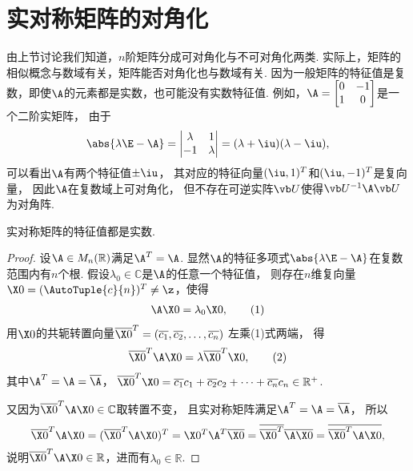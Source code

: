\section{实对称矩阵的对角化}
由上节讨论我们知道，\(n\)阶矩阵分成可对角化与不可对角化两类.
实际上，矩阵的相似概念与数域有关，矩阵能否对角化也与数域有关.
因为一般矩阵的特征值是复数，即使\(\A\)的元素都是实数，也可能没有实数特征值.
例如，\(\A = \begin{bmatrix} 0 & -1 \\ 1 & 0 \end{bmatrix}\)是一个二阶实矩阵，
由于\[
	\abs{\lambda\E-\A}
	= \begin{vmatrix}
		\lambda & 1 \\
		-1 & \lambda
	\end{vmatrix}
	= (\lambda+\iu)(\lambda-\iu),
\]
可以看出\(\A\)有两个特征值\(\pm\iu\)，
其对应的特征向量\((\iu,1)^T\)和\((\iu,-1)^T\)是复向量，
因此\(\A\)在复数域上可对角化，
但不存在可逆实阵\(\P\)使得\(\P^{-1}\A\P\)为对角阵.

\begin{theorem}\label{theorem:特征值与特征向量.实对称矩阵1}
实对称矩阵的特征值都是实数.
\begin{proof}
设\(\A \in M_n(\mathbb{R})\)满足\(\A^T=\A\).
显然\(\A\)的特征多项式\(\abs{\lambda\E-\A}\)在复数范围内有\(n\)个根.
假设\(\lambda_0\in\mathbb{C}\)是\(\A\)的任意一个特征值，
则存在\(n\)维复向量\(\X0=(\AutoTuple{c}{n})^T \neq \z\)，使得
\begin{gather}
	\A\X0 = \lambda_0 \X0, \tag1
\end{gather}
用\(\X0\)的共轭转置向量\(\overline{\X0}^T
=(\overline{c_1},\overline{c_2},\dotsc,\overline{c_n})\)
左乘(1)式两端，
得\begin{gather}
	\overline{\X0}^T \A \X0 = \lambda \overline{\X0}^T \X0, \tag2
\end{gather}
其中\(\A^T=\A=\overline{\A}\)，
\(\overline{\X0}^T \X0
= \overline{c_1}c_1 + \overline{c_2}c_2 + \dotsb + \overline{c_n}{c_n} \in \mathbb{R}^+\).

又因为\(\overline{\X0}^T \A \X0 \in \mathbb{C}\)取转置不变，
且实对称矩阵满足\(\A^T = \A = \overline{\A}\)，
所以\[
	\overline{\X0}^T \A \X0
	= (\overline{\X0}^T \A \X0)^T
	= \X0^T \A^T \overline{\X0}
	= \overline{\overline{\X0}^T} \overline{\A} \overline{\X0}
	= \overline{\overline{\X0}^T \A \X0},
\]
说明\(\overline{\X0}^T \A \X0 \in \mathbb{R}\)，进而有\(\lambda_0 \in \mathbb{R}\).
\end{proof}
\end{theorem}

